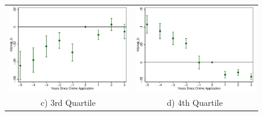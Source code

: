 \documentclass[11pt,letterpaper]{article}
\begin{document}
\begin{figure}
\begin{tabular}{cc}
\includegraphics[scale=0.57]{tabfig/evstu_size3_snap_t_one_yrcfcttr_5_3}&\includegraphics[scale=0.57]{tabfig/evstu_size4_snap_t_one_yrcfcttr_5_3}\\
c) 3rd Quartile & d) 4th Quartile\\
\end{tabular}
\end{figure}
\end{document}
